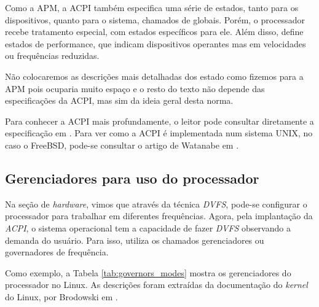 Como a APM, a ACPI também especifica uma série de estados, tanto para os dispositivos, quanto para o sistema, chamados de globais. Porém, o processador recebe tratamento especial, com estados específicos para ele. Além disso, define estados de performance, que indicam dispositivos operantes mas em velocidades ou frequências reduzidas.

Não colocaremos as descrições mais detalhadas dos estado como fizemos para a APM pois ocuparia muito espaço e o resto do texto não depende das especificações da ACPI, mas sim da ideia geral desta norma.

Para conhecer a ACPI mais profundamente, o leitor pode consultar diretamente a especificação em \cite{hewlett2004microsoft}. Para ver como a ACPI é implementada num sistema UNIX, no caso o FreeBSD, pode-se consultar o artigo de Watanabe em \cite{watanabe2002acpi}.

\subsection{Gerenciadores para uso do processador}

Na seção de \emph{hardware}, vimos que através da técnica \emph{DVFS}, pode-se configurar o processador para trabalhar em diferentes frequências. Agora, pela implantação da \emph{ACPI}, o sistema operacional tem a capacidade de fazer \emph{DVFS} observando a demanda do usuário. Para isso, utiliza os chamados gerenciadores ou governadores de frequência.

Como exemplo, a Tabela \ref{tab:governors_modes} mostra os gerenciadores do processador no Linux. As descrições foram extraídas da documentação do \emph{kernel} do Linux, por Brodowski em \cite{DOCgovernors:Online}.

